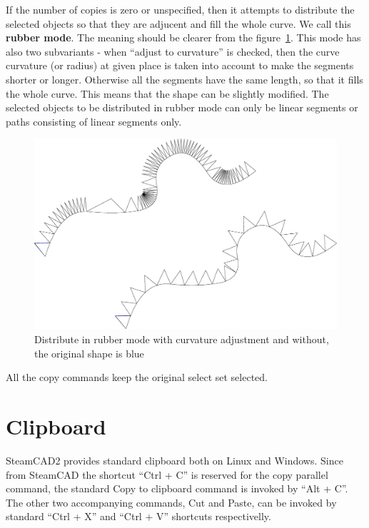 \begin{enumerate}
If the number of copies is zero or unspecified, then it attempts to distribute
the selected objects so that they are adjucent and fill the whole curve. We call
this \textbf{rubber mode}. The meaning should be clearer from the
figure~\ref{fig:distr_rubber}.
This mode has also two subvariants - when ``adjust to curvature'' is checked, then
the curve curvature (or radius) at given place is taken into account to make the
segments shorter or longer. Otherwise all the segments have the same length, so that
it fills the whole curve. This means that the shape can be slightly modified. The
selected objects to be distributed in rubber mode can only be linear segments or
paths consisting of linear segments only.

\begin{figure}[h]
\begin{center}
\includegraphics[scale=0.2]{Images/distr_rubber.eps}
\caption{Distribute in rubber mode with curvature adjustment and without, the
original shape is blue}
\label{fig:distr_rubber}
\end{center}
\end{figure}

\end{enumerate}

All the copy commands keep the original select set selected.

\section{Clipboard}

SteamCAD2 provides standard clipboard both on Linux and Windows. Since from SteamCAD the
shortcut ``Ctrl + C'' is reserved for the copy parallel command, the standard Copy to
clipboard command is invoked by ``Alt + C''. The other two accompanying commands, Cut and
Paste, can be invoked by standard ``Ctrl + X'' and ``Ctrl + V'' shortcuts respectivelly.

